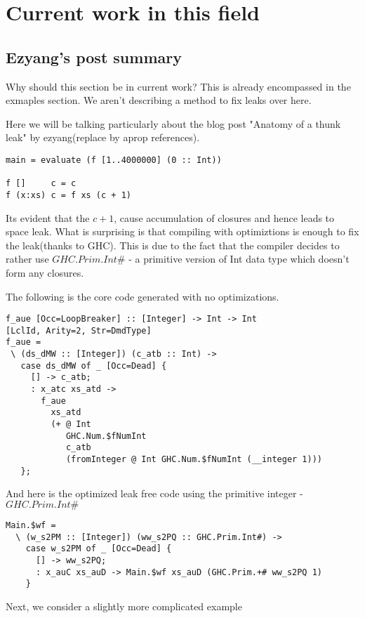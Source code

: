 
\chapter{Current work in this field}

\section{Ezyang's post summary}

Why should this section be in current work? This is already encompassed in the
exmaples section. We aren't describing a method to fix leaks over here.

Here we will be talking particularly about the blog post "Anatomy of a thunk 
leak" by ezyang(replace by aprop references).

\begin{lstlisting}
main = evaluate (f [1..4000000] (0 :: Int))

f []     c = c
f (x:xs) c = f xs (c + 1)
\end{lstlisting}
Its evident that the $c+1$, cause accumulation of closures and hence leads to
space leak. What is surprising is that compiling with optimiztions is enough to 
fix the leak(thanks to GHC). This is due to the fact that the compiler decides 
to rather use $GHC.Prim.Int\#$ - a primitive version of Int data type which 
doesn't form any closures.

The following is the core code generated with no optimizations.
\begin{lstlisting}
f_aue [Occ=LoopBreaker] :: [Integer] -> Int -> Int
[LclId, Arity=2, Str=DmdType]
f_aue =
 \ (ds_dMW :: [Integer]) (c_atb :: Int) ->
   case ds_dMW of _ [Occ=Dead] {
     [] -> c_atb;
     : x_atc xs_atd ->
       f_aue
         xs_atd
         (+ @ Int
            GHC.Num.$fNumInt
            c_atb
            (fromInteger @ Int GHC.Num.$fNumInt (__integer 1)))
   };
\end{lstlisting}

And here is the optimized leak free code using the primitive integer - 
$GHC.Prim.Int\#$

\begin{lstlisting}
Main.$wf =
  \ (w_s2PM :: [Integer]) (ww_s2PQ :: GHC.Prim.Int#) ->
    case w_s2PM of _ [Occ=Dead] {
      [] -> ww_s2PQ;
      : x_auC xs_auD -> Main.$wf xs_auD (GHC.Prim.+# ww_s2PQ 1)
    }
\end{lstlisting}

Next, we consider a slightly more complicated example

